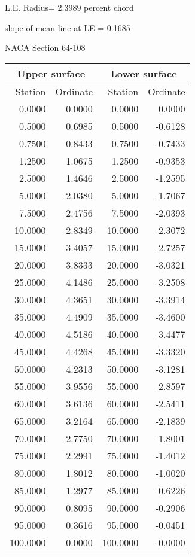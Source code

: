 \documentclass[11pt]{book}
\begin{document}
L.E. Radius=  2.3989 percent chord


 slope of mean line at LE =  0.1685
 \newpage
  \label{s64-108}
 \begin{Large}
 NACA Section 64-108
 \end{Large}
  
 \vspace{8mm}
 \begin{tabular}{|r|r|r|r|} \hline 
 \multicolumn{2}{|c|}{Upper surface} & \multicolumn{2}{|c|}{Lower surface} \\
 \hline
 Station & Ordinate & Station & Ordinate \\
 \hline
0.0000 & 0.0000 & 0.0000 & 0.0000 \\
0.5000 & 0.6985 & 0.5000 & -0.6128 \\
0.7500 & 0.8433 & 0.7500 & -0.7433 \\
1.2500 & 1.0675 & 1.2500 & -0.9353 \\
2.5000 & 1.4646 & 2.5000 & -1.2595 \\
5.0000 & 2.0380 & 5.0000 & -1.7067 \\
7.5000 & 2.4756 & 7.5000 & -2.0393 \\
10.0000 & 2.8349 & 10.0000 & -2.3072 \\
15.0000 & 3.4057 & 15.0000 & -2.7257 \\
20.0000 & 3.8333 & 20.0000 & -3.0321 \\
25.0000 & 4.1486 & 25.0000 & -3.2508 \\
30.0000 & 4.3651 & 30.0000 & -3.3914 \\
35.0000 & 4.4909 & 35.0000 & -3.4600 \\
40.0000 & 4.5186 & 40.0000 & -3.4477 \\
45.0000 & 4.4268 & 45.0000 & -3.3320 \\
50.0000 & 4.2313 & 50.0000 & -3.1281 \\
55.0000 & 3.9556 & 55.0000 & -2.8597 \\
60.0000 & 3.6136 & 60.0000 & -2.5411 \\
65.0000 & 3.2164 & 65.0000 & -2.1839 \\
70.0000 & 2.7750 & 70.0000 & -1.8001 \\
75.0000 & 2.2991 & 75.0000 & -1.4012 \\
80.0000 & 1.8012 & 80.0000 & -1.0020 \\
85.0000 & 1.2977 & 85.0000 & -0.6226 \\
90.0000 & 0.8095 & 90.0000 & -0.2906 \\
95.0000 & 0.3616 & 95.0000 & -0.0451 \\
100.0000 & 0.0000 & 100.0000 & -0.0000 \\
 \hline 
 \end{tabular}
\end{document}
